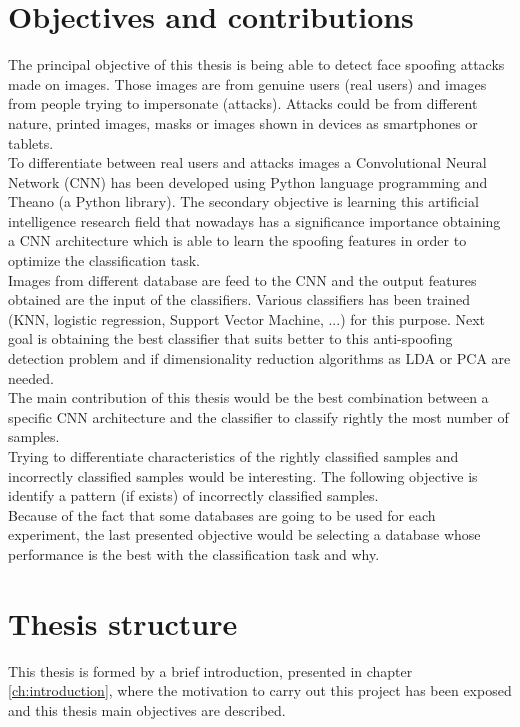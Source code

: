 \section{Objectives and contributions}
The principal objective of this thesis is being able to detect face spoofing attacks made on images. Those images are from genuine users (real users) and images from people trying to impersonate (attacks). Attacks could be from different nature, printed images, masks or images shown in devices as smartphones or tablets.\\

To differentiate between real users and attacks images a Convolutional Neural Network (CNN) has been developed using Python language programming and Theano (a Python library). The secondary objective is learning this artificial intelligence research field that nowadays has a significance importance obtaining a CNN architecture which is able to learn the spoofing features in order to optimize the classification task.\\

Images from different database are feed to the CNN and the output features obtained are the input of the classifiers. Various classifiers has been trained (KNN, logistic regression, Support Vector Machine, ...) for this purpose. Next goal is obtaining the best classifier that suits better to this anti-spoofing detection problem and if dimensionality reduction algorithms as LDA or PCA are needed.\\

The main contribution of this thesis would be the best combination between a specific CNN architecture and the classifier to classify rightly the most number of samples.\\

Trying to differentiate characteristics of the rightly classified samples and incorrectly classified samples would be interesting. The following objective is identify a pattern (if exists) of incorrectly classified samples.\\

Because of the fact that some databases are going to be used for each experiment, the last presented objective would be  selecting a database whose performance is the best with the classification task and why.\\

\section{Thesis structure}
This thesis is formed by a brief introduction, presented in chapter \ref{ch:introduction}, where the motivation to carry out this project has been exposed and this thesis main objectives are described.\\

